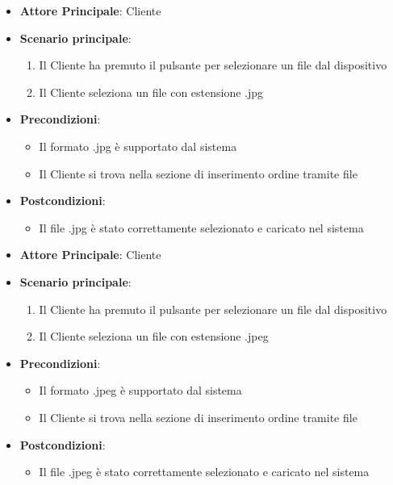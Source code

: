 \begin{itemize}
    \item \textbf{Attore Principale}: Cliente
    \item \textbf{Scenario principale}:
        \begin{enumerate}
            \item Il Cliente ha premuto il pulsante per selezionare un file dal dispositivo
            \item Il Cliente seleziona un file con estensione .jpg
        \end{enumerate}
    \item \textbf{Precondizioni}:
        \begin{itemize}
            \item Il formato .jpg è supportato dal sistema
            \item Il Cliente si trova nella sezione di inserimento ordine tramite file
        \end{itemize}
    \item \textbf{Postcondizioni}: 
        \begin{itemize}
            \item Il file .jpg è stato correttamente selezionato e caricato nel sistema
        \end{itemize}
\end{itemize}

\label{uc_11.2.2}

\begin{itemize}
    \item \textbf{Attore Principale}: Cliente
    \item \textbf{Scenario principale}:
        \begin{enumerate}
            \item Il Cliente ha premuto il pulsante per selezionare un file dal dispositivo
            \item Il Cliente seleziona un file con estensione .jpeg
        \end{enumerate}
    \item \textbf{Precondizioni}:
        \begin{itemize}
            \item Il formato .jpeg è supportato dal sistema
            \item Il Cliente si trova nella sezione di inserimento ordine tramite file
        \end{itemize}
    \item \textbf{Postcondizioni}: 
        \begin{itemize}
            \item Il file .jpeg è stato correttamente selezionato e caricato nel sistema
        \end{itemize}
\end{itemize}


